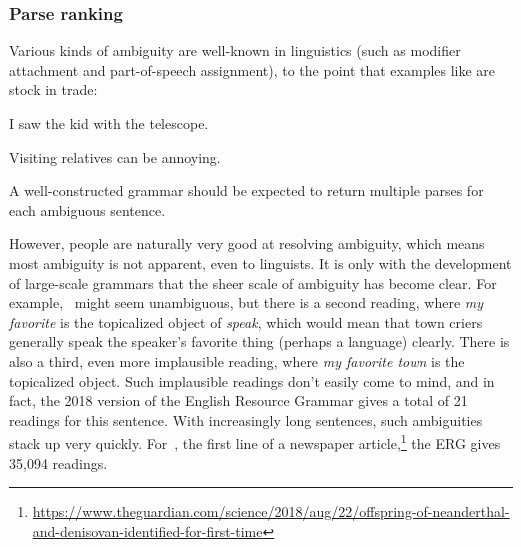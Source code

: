 \documentclass[output=paper,nonflat]{langsci/langscibook}
\begin{document}
\subsubsection{Parse ranking}
\label{cl:prac:rank}

Various kinds of ambiguity are well-known in linguistics
(such as modifier attachment and part-of-speech assignment),
to the point that examples like  are stock in trade:

\begin{exe}
\ex\label{cl:ambig-telescope} 
\begin{xlist}
\item I saw the kid with the telescope.
\item Visiting relatives can be annoying.
\end{xlist}
\end{exe}


\noindent
A well-constructed grammar should be expected to return multiple
parses for each ambiguous sentence.

However, people are naturally very good at resolving ambiguity,
which means most ambiguity is not apparent, even to linguists.
It is only with the development of large-scale grammars that the sheer scale of ambiguity has become clear.
For example, ~might seem unambiguous,
but there is a second reading, where \textit{my favorite} is the topicalized object of \textit{speak},
which would mean that town criers generally speak the speaker's favorite thing (perhaps a language) clearly.
There is also a third, even more implausible reading, where \textit{my favorite town} is the topicalized object.
Such implausible readings don't easily come to mind,
and in fact, the 2018 version of the English Resource Grammar \citep[ERG;][]{Flickinger2000a,Flickinger2011a-u}
gives a total of 21 readings for this sentence.
With increasingly long sentences, such ambiguities stack up very quickly.
For~, the first line of a newspaper article,\footnote{%
	\url{https://www.theguardian.com/science/2018/aug/22/offspring-of-neanderthal-and-denisovan-identified-for-first-time}
}
the ERG gives 35,094 readings.
\end{document}
